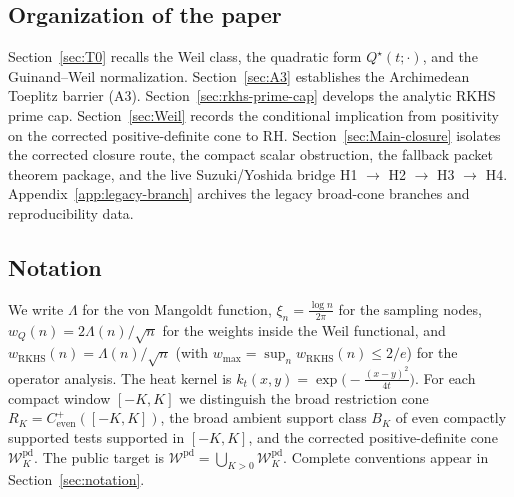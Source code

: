 \subsection*{Organization of the paper}

Section~\ref{sec:T0} recalls the Weil class, the quadratic form $Q^\star(t;\cdot)$, and the Guinand--Weil normalization. Section~\ref{sec:A3} establishes the Archimedean Toeplitz barrier (A3). Section~\ref{sec:rkhs-prime-cap} develops the analytic RKHS prime cap. Section~\ref{sec:Weil} records the conditional implication from positivity on the corrected positive-definite cone to RH. Section~\ref{sec:Main-closure} isolates the corrected closure route, the compact scalar obstruction, the fallback packet theorem package, and the live Suzuki/Yoshida bridge \textup{H1} $\to$ \textup{H2} $\to$ \textup{H3} $\to$ \textup{H4}. Appendix~\ref{app:legacy-branch} archives the legacy broad-cone branches and reproducibility data.

\subsection*{Notation}

We write $\Lambda$ for the von Mangoldt function, $\xi_n=\frac{\log n}{2\pi}$ for the sampling nodes, $w_Q(n)=2\Lambda(n)/\sqrt{n}$ for the weights inside the Weil functional, and $w_{\mathrm{RKHS}}(n)=\Lambda(n)/\sqrt{n}$ (with $w_{\max}=\sup_n w_{\mathrm{RKHS}}(n)\le 2/e$) for the operator analysis. The heat kernel is $k_t(x,y)=\exp\!\bigl(-\frac{(x-y)^2}{4t}\bigr)$. For each compact window $[-K,K]$ we distinguish the broad restriction cone $R_K=C^+_{\mathrm{even}}([-K,K])$, the broad ambient support class $B_K$ of even compactly supported tests supported in $[-K,K]$, and the corrected positive-definite cone $\mathcal W_K^{\mathrm{pd}}$. The public target is $\mathcal W^{\mathrm{pd}}=\bigcup_{K>0}\mathcal W_K^{\mathrm{pd}}$. Complete conventions appear in Section~\ref{sec:notation}.
